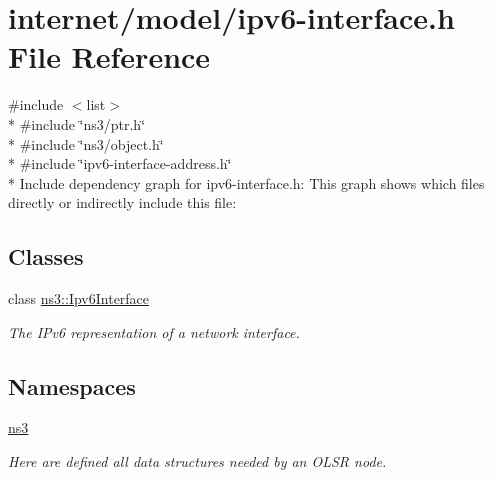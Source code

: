 \hypertarget{ipv6-interface_8h}{}\section{internet/model/ipv6-\/interface.h File Reference}
\label{ipv6-interface_8h}
{\ttfamily \#include $<$list$>$}\\*
{\ttfamily \#include \char`\"{}ns3/ptr.\+h\char`\"{}}\\*
{\ttfamily \#include \char`\"{}ns3/object.\+h\char`\"{}}\\*
{\ttfamily \#include \char`\"{}ipv6-\/interface-\/address.\+h\char`\"{}}\\*
Include dependency graph for ipv6-\/interface.h\+:
This graph shows which files directly or indirectly include this file\+:
\subsection*{Classes}
\begin{DoxyCompactItemize}
\item 
class \hyperlink{classns3_1_1Ipv6Interface}{ns3\+::\+Ipv6\+Interface}
\begin{DoxyCompactList}\small\item\em The I\+Pv6 representation of a network interface. \end{DoxyCompactList}\end{DoxyCompactItemize}
\subsection*{Namespaces}
\begin{DoxyCompactItemize}
\item 
 \hyperlink{namespacens3}{ns3}
\begin{DoxyCompactList}\small\item\em Here are defined all data structures needed by an O\+L\+SR node. \end{DoxyCompactList}\end{DoxyCompactItemize}
